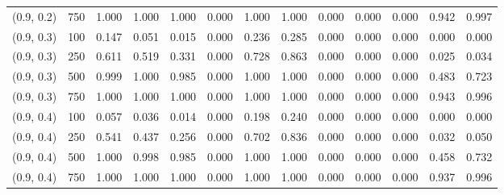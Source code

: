 \begin{table}[ht]
{\begin{tabular}{ll|ccccccccccc}
			(0.9, 0.2) & 750 & 1.000 & 1.000 & 1.000 & 0.000 & 1.000 & 1.000 & 0.000 & 0.000 & 0.000 & 0.942 & 0.997 \\
			(0.9, 0.3) & 100 & 0.147 & 0.051 & 0.015 & 0.000 & 0.236 & 0.285 & 0.000 & 0.000 & 0.000 & 0.000 & 0.000 \\
			(0.9, 0.3) & 250 & 0.611 & 0.519 & 0.331 & 0.000 & 0.728 & 0.863 & 0.000 & 0.000 & 0.000 & 0.025 & 0.034 \\
			(0.9, 0.3) & 500 & 0.999 & 1.000 & 0.985 & 0.000 & 1.000 & 1.000 & 0.000 & 0.000 & 0.000 & 0.483 & 0.723 \\
			(0.9, 0.3) & 750 & 1.000 & 1.000 & 1.000 & 0.000 & 1.000 & 1.000 & 0.000 & 0.000 & 0.000 & 0.943 & 0.996 \\
			(0.9, 0.4) & 100 & 0.057 & 0.036 & 0.014 & 0.000 & 0.198 & 0.240 & 0.000 & 0.000 & 0.000 & 0.000 & 0.000 \\
			(0.9, 0.4) & 250 & 0.541 & 0.437 & 0.256 & 0.000 & 0.702 & 0.836 & 0.000 & 0.000 & 0.000 & 0.032 & 0.050 \\
			(0.9, 0.4) & 500 & 1.000 & 0.998 & 0.985 & 0.000 & 1.000 & 1.000 & 0.000 & 0.000 & 0.000 & 0.458 & 0.732 \\
			(0.9, 0.4) & 750 & 1.000 & 1.000 & 1.000 & 0.000 & 1.000 & 1.000 & 0.000 & 0.000 & 0.000 & 0.937 & 0.996 \\
			\hline
		\end{tabular}
		
	}
\end{table}

